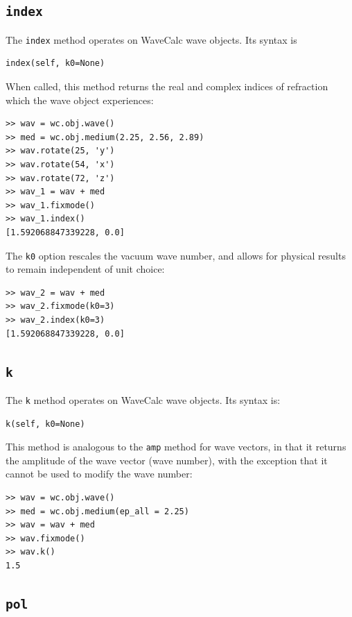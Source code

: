 \documentclass[11pt, reqno]{book}%
\newcounter{ct}
\newcommand{\tw}[1]{{\tt #1}}
\begin{document}
\subsection{\tw{index}}
\label{sec:indexmethod}

The \tw{index} method operates on WaveCalc wave objects. Its syntax is
\begin{verbatim}
index(self, k0=None)
\end{verbatim}
\noindent When called, this method returns the real and complex indices of refraction which the wave object experiences:
\begin{verbatim}
>> wav = wc.obj.wave()
>> med = wc.obj.medium(2.25, 2.56, 2.89)
>> wav.rotate(25, 'y')
>> wav.rotate(54, 'x')
>> wav.rotate(72, 'z')
>> wav_1 = wav + med
>> wav_1.fixmode()
>> wav_1.index()
[1.592068847339228, 0.0]
\end{verbatim}
\noindent The \tw{k0} option rescales the vacuum wave number, and allows for physical results to remain independent of unit choice:
\begin{verbatim}
>> wav_2 = wav + med
>> wav_2.fixmode(k0=3)
>> wav_2.index(k0=3)
[1.592068847339228, 0.0]
\end{verbatim}





\subsection{\tw{k}}
\label{sec:kmethod}

The \tw{k} method operates on WaveCalc wave objects. Its syntax is:
\begin{verbatim}
k(self, k0=None)
\end{verbatim}
\noindent This method is analogous to the \tw{amp} method for wave vectors, in that it returns the amplitude of the wave vector (wave number), with the exception that it cannot be used to modify the wave number:
\begin{verbatim}
>> wav = wc.obj.wave()
>> med = wc.obj.medium(ep_all = 2.25)
>> wav = wav + med
>> wav.fixmode()
>> wav.k()
1.5
\end{verbatim}





\subsection{\tw{pol}}
\label{sec:polmethod}
\end{document}
